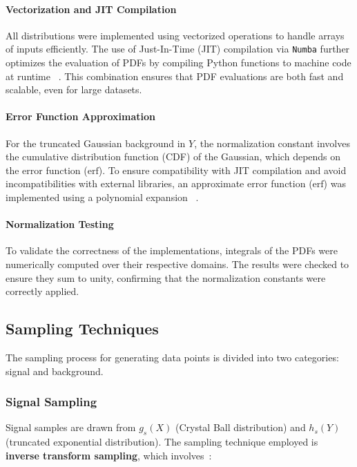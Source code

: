 \documentclass[11pt, a4paper]{article}
\begin{document}
\paragraph{Vectorization and JIT Compilation}
All distributions were implemented using vectorized operations to handle arrays of inputs efficiently. The use of Just-In-Time (JIT) compilation via \texttt{Numba} further optimizes the evaluation of PDFs by compiling Python functions to machine code at runtime ~\cite{lam2015numba}. This combination ensures that PDF evaluations are both fast and scalable, even for large datasets.

\paragraph{Error Function Approximation}
For the truncated Gaussian background in \( Y \), the normalization constant involves the cumulative distribution function (CDF) of the Gaussian, which depends on the error function (\( \text{erf} \)). To ensure compatibility with JIT compilation and avoid incompatibilities with external libraries, an approximate error function (\( \text{erf} \)) was implemented using a polynomial expansion ~\cite{abramowitz1968handbook}. 


\paragraph{Normalization Testing}
To validate the correctness of the implementations, integrals of the PDFs were numerically computed over their respective domains. The results were checked to ensure they sum to unity, confirming that the normalization constants were correctly applied.
\subsection{Sampling Techniques}

The sampling process for generating data points is divided into two categories: signal and background.

\subsubsection{Signal Sampling}

Signal samples are drawn from \( g_s(X) \) (Crystal Ball distribution) and \( h_s(Y) \) (truncated exponential distribution). The sampling technique employed is \textbf{inverse transform sampling}, which involves~\cite{olver2013fast}:
\end{document}
